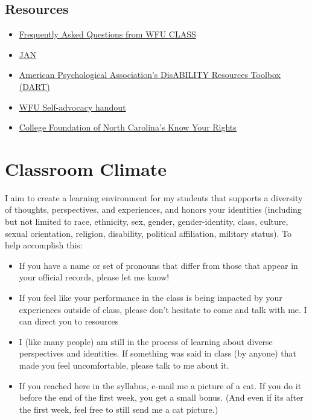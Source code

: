 \documentclass[
]{book}
\providecommand{\tightlist}{%
  \setlength{\itemsep}{0pt}\setlength{\parskip}{0pt}}
\begin{document}
\section{Resources}\label{resources}

\begin{itemize}
\tightlist
\item
  \href{https://class.wfu.edu/frequently-asked-questions-students/}{Frequently Asked Questions from WFU CLASS}
\item
  \href{https://askjan.org/}{JAN}
\item
  \href{https://www.apa.org/pi/disability/dart/}{American Psychological Association's DisABILITY Resources Toolbox (DART)}
\item
  \href{https://docs.google.com/document/d/1X44zJyTz8-s9t6IXw0bII2DCFiOk1NR2MRfTi8wBiIc/}{WFU Self-advocacy handout}
\item
  \href{https://www.cfnc.org/plan-your-future/plan-for-college/students-with-disabilities/know-your-rights/}{College Foundation of North Carolina's Know Your Rights}
\end{itemize}

\chapter{Classroom Climate}\label{classroom-climate}

I aim to create a learning environment for my students that supports a diversity of thoughts, perspectives, and experiences, and honors your identities (including but not limited to race, ethnicity, sex, gender, gender-identity, class, culture, sexual orientation, religion, disability, political affiliation, military status). To help accomplish this:

\begin{itemize}
\item
  If you have a name or set of pronouns that differ from those that appear in your official records, please let me know!
\item
  If you feel like your performance in the class is being impacted by your experiences outside of class, please don't hesitate to come and talk with me. I can direct you to resources
\item
  I (like many people) am still in the process of learning about diverse perspectives and identities. If something was said in class (by anyone) that made you feel uncomfortable, please talk to me about it.
\item
  If you reached here in the syllabus, e-mail me a picture of a cat. If you do it before the end of the first week, you get a small bonus. (And even if its after the first week, feel free to still send me a cat picture.)
\end{itemize}
\end{document}
